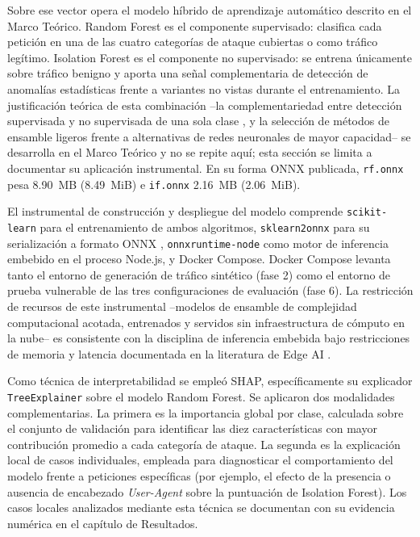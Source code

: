 Sobre ese vector opera el modelo híbrido de aprendizaje automático descrito en el Marco Teórico. Random Forest \parencite{breiman2001} es el componente supervisado: clasifica cada petición en una de las cuatro categorías de ataque cubiertas o como tráfico legítimo. Isolation Forest \parencite{liu2008} es el componente no supervisado: se entrena únicamente sobre tráfico benigno y aporta una señal complementaria de detección de anomalías estadísticas frente a variantes no vistas durante el entrenamiento. La justificación teórica de esta combinación --la complementariedad entre detección supervisada y no supervisada de una sola clase \parencite{chandola2009}, y la selección de métodos de ensamble ligeros frente a alternativas de redes neuronales de mayor capacidad-- se desarrolla en el Marco Teórico y no se repite aquí; esta sección se limita a documentar su aplicación instrumental. En su forma ONNX publicada, \texttt{rf.onnx} pesa 8.90~MB (8.49~MiB) e \texttt{if.onnx} 2.16~MB (2.06~MiB).

El instrumental de construcción y despliegue del modelo comprende \texttt{scikit-learn} \parencite{pedregosa2011} para el entrenamiento de ambos algoritmos, \texttt{sklearn2onnx} para su serialización a formato ONNX \parencite{bai2019}, \texttt{onnxruntime-node} como motor de inferencia embebido en el proceso Node.js, y Docker Compose. Docker Compose levanta tanto el entorno de generación de tráfico sintético (fase 2) como el entorno de prueba vulnerable de las tres configuraciones de evaluación (fase 6). La restricción de recursos de este instrumental --modelos de ensamble de complejidad computacional acotada, entrenados y servidos sin infraestructura de cómputo en la nube-- es consistente con la disciplina de inferencia embebida bajo restricciones de memoria y latencia documentada en la literatura de Edge AI \parencite{warden2019}.

{\sloppy Como técnica de interpretabilidad se empleó SHAP\parencite{lundberg2017shap}, específicamente su explicador \texttt{TreeExplainer} sobre el modelo Random Forest. Se aplicaron dos modalidades complementarias. La primera es la importancia global por clase, calculada sobre el conjunto de validación para identificar las diez características con mayor contribución promedio a cada categoría de ataque. La segunda es la explicación local de casos individuales, empleada para diagnosticar el comportamiento del modelo frente a peticiones específicas (por ejemplo, el efecto de la presencia o ausencia de encabezado \textit{User-Agent} sobre la puntuación de Isolation Forest). Los casos locales analizados mediante esta técnica se documentan con su evidencia numérica en el capítulo de Resultados.\par}

